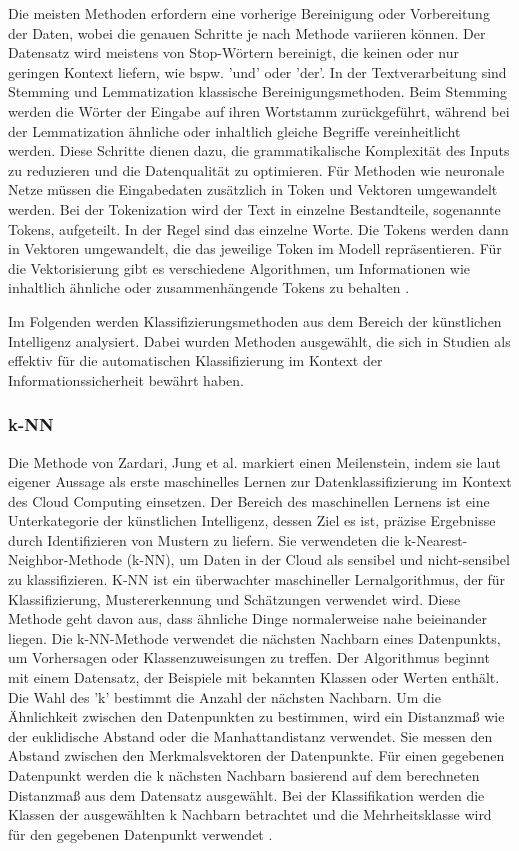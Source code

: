 Die meisten Methoden erfordern eine vorherige Bereinigung oder Vorbereitung der Daten, wobei die genauen Schritte je nach Methode variieren können. Der Datensatz wird meistens von Stop-Wörtern bereinigt, die keinen oder nur geringen Kontext liefern, wie bspw. 'und' oder 'der'. In der Textverarbeitung sind Stemming und Lemmatization klassische Bereinigungsmethoden. Beim Stemming werden die Wörter der Eingabe auf ihren Wortstamm zurückgeführt, während bei der Lemmatization ähnliche oder inhaltlich gleiche Begriffe vereinheitlicht werden.
Diese Schritte dienen dazu, die grammatikalische Komplexität des Inputs zu reduzieren und die Datenqualität zu optimieren. Für Methoden wie neuronale Netze müssen die Eingabedaten zusätzlich in Token und Vektoren umgewandelt werden. Bei der Tokenization wird der Text in einzelne Bestandteile, sogenannte Tokens, aufgeteilt. In der Regel sind das einzelne Worte. Die Tokens werden dann in Vektoren umgewandelt, die das jeweilige Token im Modell repräsentieren. Für die Vektorisierung gibt es verschiedene Algorithmen, um Informationen wie inhaltlich ähnliche oder zusammenhängende Tokens zu behalten \cite{Kamath.2019}.

Im Folgenden werden Klassifizierungsmethoden aus dem Bereich der künstlichen Intelligenz analysiert. Dabei wurden Methoden ausgewählt, die sich in Studien als effektiv für die automatischen Klassifizierung im Kontext der Informationssicherheit bewährt haben.


\subsubsection{k-NN}
Die Methode von Zardari, Jung et al. \cite{Zardari.2014} markiert einen Meilenstein, indem sie laut eigener Aussage als erste maschinelles Lernen zur Datenklassifizierung im Kontext des Cloud Computing einsetzen. Der Bereich des maschinellen Lernens ist eine Unterkategorie der künstlichen Intelligenz, dessen Ziel es ist, präzise Ergebnisse durch Identifizieren von Mustern zu liefern. Sie verwendeten die k-Nearest-Neighbor-Methode (k-NN), um Daten in der Cloud als sensibel und nicht-sensibel zu klassifizieren. K-NN ist ein überwachter maschineller Lernalgorithmus, der für Klassifizierung, Mustererkennung und Schätzungen verwendet wird. Diese Methode geht davon aus, dass ähnliche Dinge normalerweise nahe beieinander liegen. Die k-NN-Methode verwendet die nächsten Nachbarn eines Datenpunkts, um Vorhersagen oder Klassenzuweisungen zu treffen. Der Algorithmus beginnt mit einem Datensatz, der Beispiele mit bekannten Klassen oder Werten enthält. Die Wahl des 'k' bestimmt die Anzahl der nächsten Nachbarn. Um die Ähnlichkeit zwischen den Datenpunkten zu bestimmen, wird ein Distanzmaß wie der euklidische Abstand oder die Manhattandistanz verwendet. Sie messen den Abstand zwischen den Merkmalsvektoren der Datenpunkte. Für einen gegebenen Datenpunkt werden die k nächsten Nachbarn basierend auf dem berechneten Distanzmaß aus dem Datensatz ausgewählt. Bei der Klassifikation werden die Klassen der ausgewählten k Nachbarn betrachtet und die Mehrheitsklasse wird für den gegebenen Datenpunkt verwendet \cite{Frochte.2018b}.

